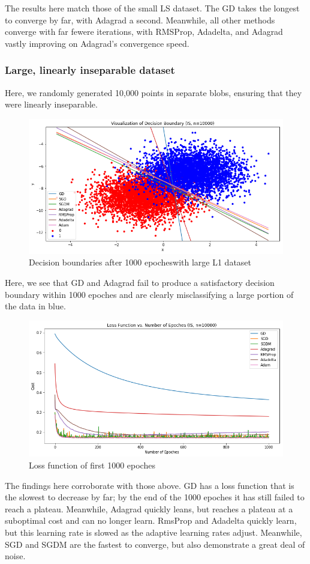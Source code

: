 \documentclass[twoside,11pt]{homework}
\begin{document}
The results here match those of the small LS dataset. The GD takes the longest to converge by far, with Adagrad a second. Meanwhile, all other methods converge with far fewere iterations, with RMSProp, Adadelta, and Adagrad vastly improving on Adagrad's convergence speed.

\subsubsection*{Large, linearly inseparable dataset}
Here, we randomly generated 10,000 points in separate blobs, ensuring that they were linearly inseparable.

\begin{figure}[H]
		\centering
		\includegraphics[scale=.5]{q5/insep_10000/lines.png}
		\caption{Decision boundaries after 1000 epocheswith large L1 dataset}
	\end{figure}

Here, we see that GD and Adagrad fail to produce a satisfactory decision boundary within 1000 epoches and are clearly misclassifying a large portion of the data in blue.

	\begin{figure}[H]
		\centering
		\includegraphics[scale=.5]{q5/insep_10000/loss_n1000.png}
		\caption{Loss function of first 1000 epoches}
	\end{figure}
The findings here corroborate with those above. GD has a loss function that is the slowest to decrease by far; by the end of the 1000 epoches it has still failed to reach a plateau. Meanwhile, Adagrad quickly leans, but reaches a plateau at a suboptimal cost and can no longer learn. RmsProp and Adadelta quickly learn, but this learning rate is slowed as the adaptive learning rates adjust. Meanwhile, SGD and SGDM are the fastest to converge, but also demonstrate a great deal of noise.
\end{document}
